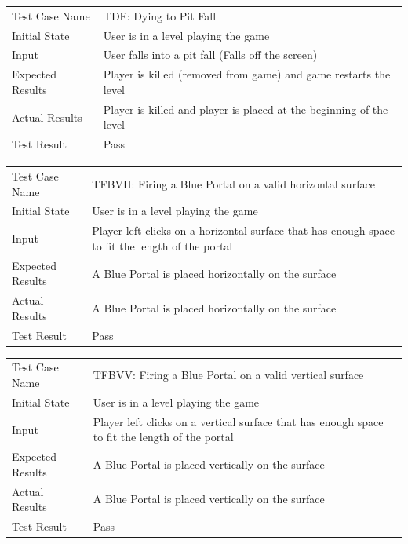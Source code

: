 \documentclass[12pt, titlepage]{article}
\begin{document}
\begin{center}
\begin{tabular}{ | l | p{10cm} | }
\hline
Test Case Name & TDF: Dying to Pit Fall	\\
Initial State & User is in a level playing the game	\\
Input & User falls into a pit fall (Falls off the screen)	\\
Expected Results & Player is killed (removed from game) and game restarts the level	\\
Actual Results & Player is killed and player is placed at the beginning of the level	\\
Test Result & Pass	\\
\hline
\end{tabular}
\end{center}

\begin{center}
\begin{tabular}{ | l | p{10cm} | }
\hline
Test Case Name & TFBVH: Firing a Blue Portal on a valid horizontal surface	\\
Initial State & User is in a level playing the game	\\
Input & Player left clicks on a horizontal surface that has enough space to fit the length of the portal	\\
Expected Results & A Blue Portal is placed horizontally on the surface	\\
Actual Results & A Blue Portal is placed horizontally on the surface	\\
Test Result & Pass	\\
\hline
\end{tabular}
\end{center}

\begin{center}
\begin{tabular}{ | l | p{10cm} | }
\hline
Test Case Name & TFBVV: Firing a Blue Portal on a valid vertical surface	\\
Initial State & User is in a level playing the game	\\
Input & Player left clicks on a vertical surface that has enough space to fit the length of the portal	\\
Expected Results & A Blue Portal is placed vertically on the surface	\\
Actual Results & A Blue Portal is placed vertically on the surface	\\
Test Result & Pass	\\
\hline
\end{tabular}
\end{center}
\end{document}
